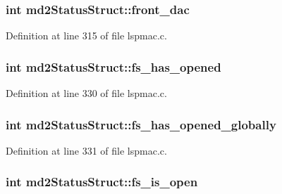 \hypertarget{structmd2StatusStruct_a3be73c48b09190241a2bcb801af5b97c}{
\subsubsection[{front\-\_\-dac}]{\setlength{\rightskip}{0pt plus 5cm}int md2\-Status\-Struct\-::front\-\_\-dac}}\label{structmd2StatusStruct_a3be73c48b09190241a2bcb801af5b97c}


Definition at line 315 of file lspmac.\-c.

\hypertarget{structmd2StatusStruct_ab961c2ba24a1a8c95a88dec25319e712}{
\subsubsection[{fs\-\_\-has\-\_\-opened}]{\setlength{\rightskip}{0pt plus 5cm}int md2\-Status\-Struct\-::fs\-\_\-has\-\_\-opened}}\label{structmd2StatusStruct_ab961c2ba24a1a8c95a88dec25319e712}


Definition at line 330 of file lspmac.\-c.

\hypertarget{structmd2StatusStruct_ac95696b7ed35ccfdfb6aeeee879bdb65}{
\subsubsection[{fs\-\_\-has\-\_\-opened\-\_\-globally}]{\setlength{\rightskip}{0pt plus 5cm}int md2\-Status\-Struct\-::fs\-\_\-has\-\_\-opened\-\_\-globally}}\label{structmd2StatusStruct_ac95696b7ed35ccfdfb6aeeee879bdb65}


Definition at line 331 of file lspmac.\-c.

\hypertarget{structmd2StatusStruct_aca3722c109e6646bd41fb269a32261f2}{
\subsubsection[{fs\-\_\-is\-\_\-open}]{\setlength{\rightskip}{0pt plus 5cm}int md2\-Status\-Struct\-::fs\-\_\-is\-\_\-open}}\label{structmd2StatusStruct_aca3722c109e6646bd41fb269a32261f2}


